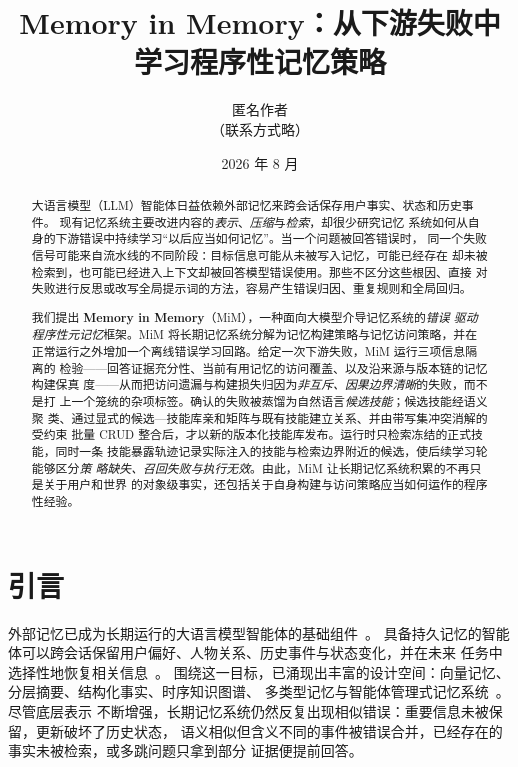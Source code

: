 \documentclass[UTF8,11pt]{ctexart}
\title{\textbf{Memory in Memory：从下游失败中学习程序性记忆策略}}
\author{匿名作者 \\ \small（联系方式略）}
\date{2026 年 8 月}
\begin{document}
\maketitle

\begin{abstract}
大语言模型（LLM）智能体日益依赖外部记忆来跨会话保存用户事实、状态和历史事件。
现有记忆系统主要改进内容的\emph{表示}、\emph{压缩}与\emph{检索}，却很少研究记忆
系统如何从自身的下游错误中持续学习“以后应当如何记忆”。当一个问题被回答错误时，
同一个失败信号可能来自流水线的不同阶段：目标信息可能从未被写入记忆，可能已经存在
却未被检索到，也可能已经进入上下文却被回答模型错误使用。那些不区分这些根因、直接
对失败进行反思或改写全局提示词的方法，容易产生错误归因、重复规则和全局回归。

我们提出 \textbf{Memory in Memory}（MiM），一种面向大模型介导记忆系统的\emph{错误
驱动程序性元记忆}框架。MiM 将长期记忆系统分解为记忆构建策略与记忆访问策略，并在
正常运行之外增加一个离线错误学习回路。给定一次下游失败，MiM 运行三项信息隔离的
检验——回答证据充分性、当前有用记忆的访问覆盖、以及沿来源与版本链的记忆构建保真
度——从而把访问遗漏与构建损失归因为\emph{非互斥、因果边界清晰}的失败，而不是打
上一个笼统的杂项标签。确认的失败被蒸馏为自然语言\emph{候选技能}；候选技能经语义聚
类、通过显式的候选—技能库亲和矩阵与既有技能建立关系、并由带写集冲突消解的受约束
批量 CRUD 整合后，才以新的版本化技能库发布。运行时只检索冻结的正式技能，同时一条
技能暴露轨迹记录实际注入的技能与检索边界附近的候选，使后续学习轮能够区分\emph{策
略缺失、召回失败与执行无效}。由此，MiM 让长期记忆系统积累的不再只是关于用户和世界
的对象级事实，还包括关于自身构建与访问策略应当如何运作的程序性经验。
\end{abstract}


\section{引言}
\label{sec:intro}

外部记忆已成为长期运行的大语言模型智能体的基础组件~\cite{packer2023memgpt,du2026survey}。
具备持久记忆的智能体可以跨会话保留用户偏好、人物关系、历史事件与状态变化，并在未来
任务中选择性地恢复相关信息~\cite{park2023generative,wu2024longmemeval,maharana2024locomo}。
围绕这一目标，已涌现出丰富的设计空间：向量记忆、分层摘要、结构化事实、时序知识图谱、
多类型记忆与智能体管理式记忆系统~\cite{packer2023memgpt,zhang2025amem,
chattopadhyay2025mem0,chen2025memoryos,vlasic2025mirix,zhu2025graphiti}。尽管底层表示
不断增强，长期记忆系统仍然反复出现相似错误：重要信息未被保留，更新破坏了历史状态，
语义相似但含义不同的事件被错误合并，已经存在的事实未被检索，或多跳问题只拿到部分
证据便提前回答。
\end{document}
